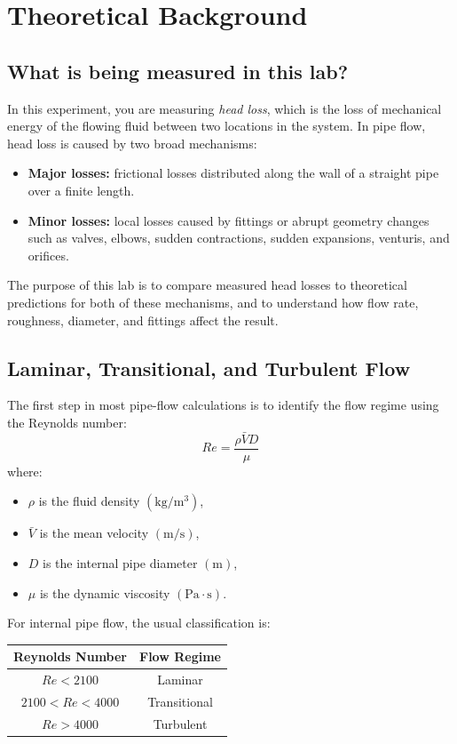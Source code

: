 \section{Theoretical Background}

\subsection{What is being measured in this lab?}
In this experiment, you are measuring \emph{head loss}, which is the loss of mechanical energy of the flowing fluid between two locations in the system. In pipe flow, head loss is caused by two broad mechanisms:

\begin{itemize}[leftmargin=*]
    \item \textbf{Major losses:} frictional losses distributed along the wall of a straight pipe over a finite length.
    \item \textbf{Minor losses:} local losses caused by fittings or abrupt geometry changes such as valves, elbows, sudden contractions, sudden expansions, venturis, and orifices.
\end{itemize}

The purpose of this lab is to compare measured head losses to theoretical predictions for both of these mechanisms, and to understand how flow rate, roughness, diameter, and fittings affect the result.

\subsection{Laminar, Transitional, and Turbulent Flow}
The first step in most pipe-flow calculations is to identify the flow regime using the Reynolds number:
\begin{equation}
Re = \frac{\rho \bar{V} D}{\mu}
\label{eq:reynolds}
\end{equation}
where:
\begin{itemize}[leftmargin=*]
    \item \(\rho\) is the fluid density \((\mathrm{kg/m^3})\),
    \item \(\bar{V}\) is the mean velocity \((\mathrm{m/s})\),
    \item \(D\) is the internal pipe diameter \((\mathrm{m})\),
    \item \(\mu\) is the dynamic viscosity \((\mathrm{Pa\cdot s})\).
\end{itemize}

For internal pipe flow, the usual classification is:
\begin{center}
\begin{tabular}{cc}
\toprule
Reynolds Number & Flow Regime \\
\midrule
\(Re < 2100\) & Laminar \\
\(2100 < Re < 4000\) & Transitional \\
\(Re > 4000\) & Turbulent \\
\bottomrule
\end{tabular}
\end{center}

